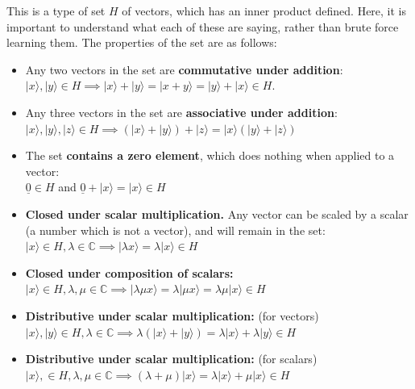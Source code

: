 \documentclass[12pt]{article}
\begin{document}
This is a type of set $H$ of vectors, which has an inner product defined. Here, it is important to understand what each of these are saying, rather than brute force learning them. The properties of the set are as follows:

\begin{itemize}
	\item Any two vectors in the set are \textbf{commutative under addition}: \\$\lvert x \rangle, \lvert y \rangle \in H \implies \lvert x \rangle + \lvert y \rangle = \lvert x + y \rangle = \lvert y \rangle + \lvert x \rangle \in H$.
	\item Any three vectors in the set are \textbf{associative under addition}: \\$\lvert x \rangle, \lvert y \rangle, \lvert z \rangle \in H \implies (\lvert x \rangle + \lvert y \rangle) + \lvert z \rangle = \lvert x \rangle (\lvert y \rangle + \lvert z \rangle)$
	\item The set \textbf{contains a zero element}, which does nothing when applied to a vector:\\$\underline{0} \in H$ and $\underline{0} + \lvert x \rangle = \lvert x \rangle \in H$
	\item \textbf{Closed under scalar multiplication. }Any vector can be scaled by a scalar (a number which is not a vector), and will remain in the set: \\$\lvert x \rangle \in H, \lambda \in \mathbb{C} \implies \lvert \lambda x \rangle = \lambda \lvert x \rangle \in H$
	\item \textbf{Closed under composition of scalars: }\\$\lvert x \rangle \in H , \lambda, \mu \in \mathbb{C} \implies \lvert \lambda \mu x \rangle = \lambda \lvert \mu x \rangle = \lambda \mu \lvert x \rangle \in H$
	\item \textbf{Distributive under scalar multiplication:} (for vectors)\\$\lvert x \rangle, \lvert y \rangle \in H, \lambda \in \mathbb{C} \implies \lambda(\lvert x \rangle + \lvert y \rangle) = \lambda \lvert x \rangle + \lambda \lvert y \rangle \in H$ 
	\item \textbf{Distributive under scalar multiplication:} (for scalars)\\$\lvert x \rangle, \in H, \lambda, \mu \in \mathbb{C} \implies (\lambda + \mu)\lvert x \rangle = \lambda \lvert x \rangle + \mu \lvert x \rangle \in H$ 
\end{itemize}
\end{document}

